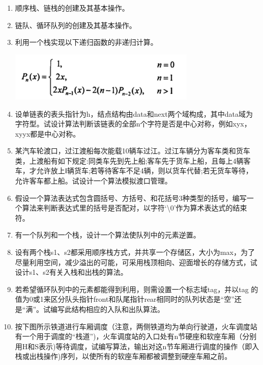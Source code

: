 \documentclass[lang=cn,newtx,10pt,scheme=chinese]{../../elegantbook}
\begin{document}
\begin{enumerate}
\def\labelenumii{\arabic{enumii}.}
\item
    顺序栈、链栈的创建及其基本操作。
  \vspace{5cm}
\item
    链队、循环队列的创建及其基本操作。
  \vspace{5cm}
\item
    利用一个栈实现以下递归函数的非递归计算。

    \includegraphics[width=3.50833in,height=0.91806in]{./images/image1.png}
  \vspace{5cm}
\item
    设单链表的表头指针为h，结点结构由data和next两个域构成，其中data域为字符型。试设计算法判断该链表的全部n个字符是否是中心对称，例如xyx，xyyx都是中心对称。
  \vspace{5cm}
\item
    某汽车轮渡口，过江渡船每次能载10辆车过江。过江车辆分为客车类和货车类，上渡船有如下规定:同类车先到先上船;客车先于货车上船，且每上4辆客车，才允许放上Ⅰ辆货车;若等待客车不足4辆，则以货车代替;若无货车等待，允许客车都上船。试设计一个算法模拟渡口管理。
  \vspace{5cm}
\item
    假设一个算法表达式包含圆括号、方括号、和花括号3种类型的括号，编写一个算法来判断表达式里的括号是否配对，以字符`\textbackslash0'作为算术表达式的结束符。
  \vspace{5cm}
\item
    有一个队列和一个栈，设计一个算法使队列中的元素逆置。
  \vspace{5cm}
\item
    设有两个栈s1、s2都采用顺序栈方式，并共享一个存储区，大小为max，为了尽量利用空间，减少溢出的可能，可采用栈顶相向、迎面增长的存储方式，试设计s1、s2有关入栈和出栈的算法。
  \vspace{5cm}
\item
    若希望循环队列中的元素都能得到利用，则需设置一个标志域tag，并以tag
    的值为0或1来区分队头指针front和队尾指针rear相同时的队列状态是``空''还是``满''。试编写此结构相应的入队和出队算法。
  \vspace{5cm}
\item
    按下图所示铁道进行车厢调度（注意，两侧铁道均为单向行驶道，火车调度站有一个用于调度的``栈道'')，火车调度站的入口处有n节硬座和软座车厢（分别用H和S表示)等待调度，试编写算法，输出对这n节车厢进行调度的操作（即入栈或出栈操作)序列，以使所有的软座车厢都被调整到硬座车厢之前。


\end{enumerate}
\end{document}
